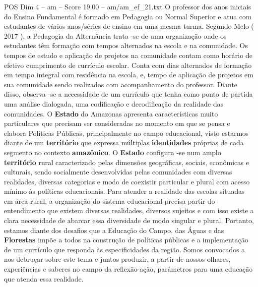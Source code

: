 \begin{textsample}{POS Dim 4 – am – Score 19.00 – am/am\_ef\_21.txt}
O professor dos anos iniciais do Ensino Fundamental é formado em Pedagogia ou Normal Superior e atua com estudantes de vários anos/séries de ensino em uma mesma turma.
Segundo Melo ( 2017 ), a Pedagogia da Alternância trata -se de uma organização onde os estudantes têm formação com tempos alternados na escola e na comunidade.
Os tempos de estudo e aplicação de projetos na comunidade contam como horário de efetivo cumprimento de currículo escolar.
Conta com dias alternados de formação em tempo integral com residência na escola, e, tempo de aplicação de projetos em sua comunidade sendo realizados com acompanhamento do professor.
Diante disso, observa -se a necessidade de um currículo que tenha como ponto de partida uma análise dialogada, uma codificação e decodificação da realidade das comunidades.
O \textbf{Estado} do Amazonas apresenta características muito particulares que precisam ser consideradas no momento em que se pensa e elabora Políticas Públicas, principalmente no campo educacional, visto estarmos diante de um \textbf{território} que expressa múltiplas \textbf{identidades} próprias de cada segmento no contexto \textbf{amazônico}.
O \textbf{Estado} configura -se num amplo \textbf{território} rural caracterizado pelas dimensões geográficas, sociais, econômicas e culturais, sendo socialmente desenvolvidas pelas comunidades com diversas realidades, diversas categorias e modo de coexistir particular e plural com acesso mínimo às políticas educacionais.
Para atender a realidade das escolas situadas em área rural, a organização do sistema educacional precisa partir do entendimento que existem diversas realidades, diversos sujeitos e com isso existe a clara necessidade de abarcar essa diversidade de modo singular e plural.
Portanto, estamos diante dos desafios que a Educação do Campo, das Águas e das \textbf{Florestas} impõe a todos na construção de políticas públicas e a implementação de um currículo que responda às especificidades da região.
Somos convocados a nos debruçar sobre este tema e juntos produzir, a partir de nossos olhares, experiências e saberes no campo da reflexão-ação, parâmetros para uma educação que atenda essa realidade.

\end{textsample}
